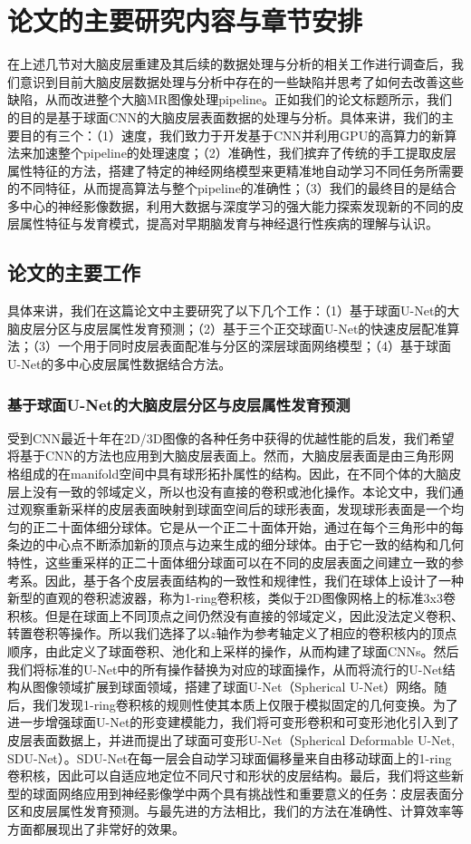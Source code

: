 \section{论文的主要研究内容与章节安排}
在上述几节对大脑皮层重建及其后续的数据处理与分析的相关工作进行调查后，我们意识到目前大脑皮层数据处理与分析中存在的一些缺陷并思考了如何去改善这些缺陷，从而改进整个大脑MR图像处理pipeline。正如我们的论文标题所示，我们的目的是基于球面CNN的大脑皮层表面数据的处理与分析。具体来讲，我们的主要目的有三个：（1）速度，我们致力于开发基于CNN并利用GPU的高算力的新算法来加速整个pipeline的处理速度；（2）准确性，我们摈弃了传统的手工提取皮层属性特征的方法，搭建了特定的神经网络模型来更精准地自动学习不同任务所需要的不同特征，从而提高算法与整个pipeline的准确性；（3）我们的最终目的是结合多中心的神经影像数据，利用大数据与深度学习的强大能力探索发现新的不同的皮层属性特征与发育模式，提高对早期脑发育与神经退行性疾病的理解与认识。

\subsection{论文的主要工作}
具体来讲，我们在这篇论文中主要研究了以下几个工作：（1）基于球面U-Net的大脑皮层分区与皮层属性发育预测；（2）基于三个正交球面U-Net的快速皮层配准算法；（3）一个用于同时皮层表面配准与分区的深层球面网络模型；（4）基于球面U-Net的多中心皮层属性数据结合方法。

\subsubsection{基于球面U-Net的大脑皮层分区与皮层属性发育预测}
受到CNN最近十年在2D/3D图像的各种任务中获得的优越性能的启发，我们希望将基于CNN的方法也应用到大脑皮层表面上。然而，大脑皮层表面是由三角形网格组成的在manifold空间中具有球形拓扑属性的结构。因此，在不同个体的大脑皮层上没有一致的邻域定义，所以也没有直接的卷积或池化操作。本论文中，我们通过观察重新采样的皮层表面映射到球面空间后的球形表面，发现球形表面是一个均匀的正二十面体细分球体。它是从一个正二十面体开始，通过在每个三角形中的每条边的中心点不断添加新的顶点与边来生成的细分球体。由于它一致的结构和几何特性，这些重采样的正二十面体细分球面可以在不同的皮层表面之间建立一致的参考系。因此，基于各个皮层表面结构的一致性和规律性，我们在球体上设计了一种新型的直观的卷积滤波器，称为1-ring卷积核，类似于2D图像网格上的标准3x3卷积核。但是在球面上不同顶点之间仍然没有直接的邻域定义，因此没法定义卷积、转置卷积等操作。所以我们选择了以$z$轴作为参考轴定义了相应的卷积核内的顶点顺序，由此定义了球面卷积、池化和上采样的操作，从而构建了球面CNNs。然后我们将标准的U-Net\cite{ronneberger2015u}中的所有操作替换为对应的球面操作，从而将流行的U-Net结构从图像领域扩展到球面领域，搭建了球面U-Net（Spherical U-Net）网络。随后，我们发现1-ring卷积核的规则性使其本质上仅限于模拟固定的几何变换。为了进一步增强球面U-Net的形变建模能力，我们将可变形卷积和可变形池化引入到了皮层表面数据上，并进而提出了球面可变形U-Net（Spherical Deformable U-Net, SDU-Net）。SDU-Net在每一层会自动学习球面偏移量来自由移动球面上的1-ring卷积核，因此可以自适应地定位不同尺寸和形状的皮层结构。最后，我们将这些新型的球面网络应用到神经影像学中两个具有挑战性和重要意义的任务：皮层表面分区和皮层属性发育预测。与最先进的方法相比，我们的方法在准确性、计算效率等方面都展现出了非常好的效果。

